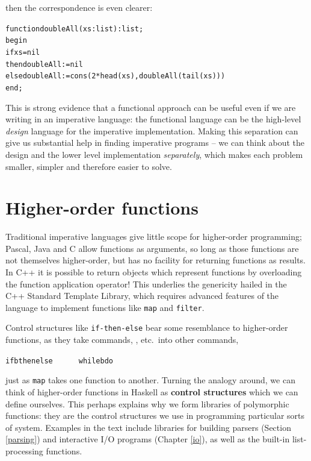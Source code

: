 then the correspondence is even clearer:
\begin{alltt}
function doubleAll(xs:list):list;
  begin
    if xs=nil 
      then doubleAll := nil
      else doubleAll := cons( 2*head(xs) , doubleAll( tail(xs) ) )
  end;
\end{alltt}
This is strong evidence that a functional approach can be useful even if  we
are writing in an imperative language: the functional language can be the
high-level {\em design\/}
language for the imperative implementation. Making
this separation can give us substantial help in finding imperative programs
-- we can think about the design and the lower level implementation {\em
separately}, which makes each problem smaller, simpler and therefore easier
to solve.
\vspace{-5pt}

\section*{Higher-order functions}
\vspace{-5pt}

Traditional imperative languages give little scope for higher-order
programming; Pascal, Java and C allow functions as arguments, so long as those
functions are not themselves higher-order, but has no facility for returning
functions as results. In C++ it is possible to return objects which
represent functions by overloading the function application operator!
This underlies the genericity hailed in the C++ Standard Template Library,
which requires advanced features of the language to implement functions
like \texttt{map} and \texttt{filter}.

Control structures like \texttt{if-then-else} bear some resemblance to
higher-order functions, as they take commands, \texttt{}, 
\texttt{} etc.\ into other commands, 
\begin{alltt}
if b then  else \ \ \ \ \ \ while b do 
\end{alltt}
just as \texttt{map} takes one function to another. Turning the analogy around,
we can think of higher-order functions in Haskell
as \textbf{control structures} which we
can define ourselves. This perhaps explains why we form libraries of
polymorphic functions: they are the control structures we use in programming
particular  sorts of system. Examples in the text include libraries for
building parsers (Section \ref{parsing}) and interactive I/O programs
(Chapter \ref{io}), as well as the built-in list-processing
functions.
\vspace{-2pt}

